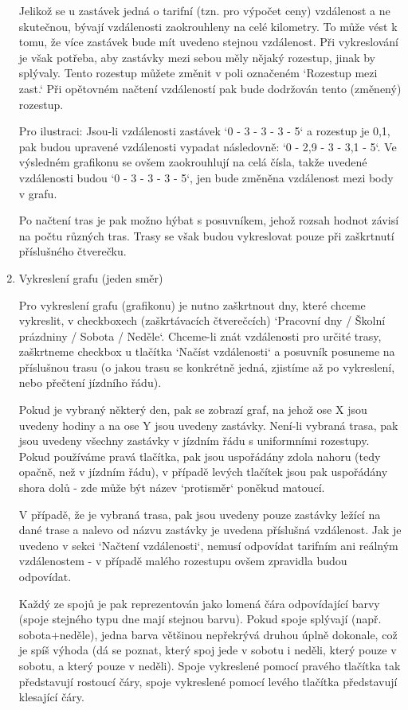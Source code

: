 \documentclass[14pt]{article}
\begin{document}
\begin{enumerate}
Jelikož se u zastávek jedná o tarifní (tzn. pro výpočet ceny) vzdálenost a ne skutečnou, bývají vzdálenosti zaokrouhleny na celé kilometry. To může vést k tomu, že více zastávek bude mít uvedeno stejnou vzdálenost. 
Při vykreslování je však potřeba, aby zastávky mezi sebou měly nějaký rozestup, jinak by splývaly. Tento rozestup můžete změnit v poli označeném `Rozestup mezi zast.` Při opětovném načtení vzdáleností pak bude dodržován tento (změnený) rozestup.

Pro ilustraci: Jsou-li vzdálenosti zastávek `0 - 3 - 3 - 3 - 5` a rozestup je 0,1, pak budou upravené vzdálenosti vypadat následovně: `0 - 2,9 - 3 - 3,1 - 5`. Ve výsledném grafikonu se ovšem zaokrouhlují na celá čísla, takže uvedené vzdálenosti budou `0 - 3 - 3 - 3 - 5`, jen bude změněna vzdálenost mezi body v grafu.

Po načtení tras je pak možno hýbat s posuvníkem, jehož rozsah hodnot závisí na počtu různých tras. Trasy se však budou vykreslovat pouze při zaškrtnutí příslušného čtverečku.

\item Vykreslení grafu (jeden směr)

Pro vykreslení grafu (grafikonu) je nutno zaškrtnout dny, které chceme vykreslit, v checkboxech (zaškrtávacích čtverečcích) `Pracovní dny / Školní prázdniny / Sobota / Neděle`. Chceme-li znát vzdálenosti pro určité trasy, zaškrtneme checkbox u tlačítka `Načíst vzdálenosti` a posuvník posuneme na příslušnou trasu 
(o jakou trasu se konkrétně jedná, zjistíme až po vykreslení, nebo přečtení jízdního řádu).

Pokud je vybraný některý den, pak se zobrazí graf, na jehož ose X jsou uvedeny hodiny a na ose Y jsou uvedeny zastávky. Není-li vybraná trasa, pak jsou uvedeny všechny zastávky v jízdním řádu s uniformními rozestupy. Pokud používáme pravá tlačítka, pak jsou uspořádány zdola nahoru (tedy opačně, než v jízdním řádu), v případě levých tlačítek jsou pak uspořádány shora dolů - zde může být název `protisměr` poněkud matoucí.

V případě, že je vybraná trasa, pak jsou uvedeny pouze zastávky ležící na dané trase a nalevo od názvu zastávky je uvedena příslušná vzdálenost. Jak je uvedeno v sekci `Načtení vzdálenosti`, nemusí odpovídat tarifním ani reálným vzdálenostem - v případě malého rozestupu ovšem zpravidla budou odpovídat.

Každý ze spojů je pak reprezentován jako lomená čára odpovídající barvy (spoje stejného typu dne mají stejnou barvu). Pokud spoje splývají (např. sobota+neděle), jedna barva většinou nepřekrývá druhou úplně dokonale, což je spíš výhoda (dá se poznat, který spoj jede v sobotu i neděli, který pouze v sobotu, a který pouze v neděli). Spoje vykreslené pomocí pravého tlačítka tak představují rostoucí čáry, spoje vykreslené pomocí levého tlačítka představují klesající čáry.


\end{enumerate}
\end{document}
